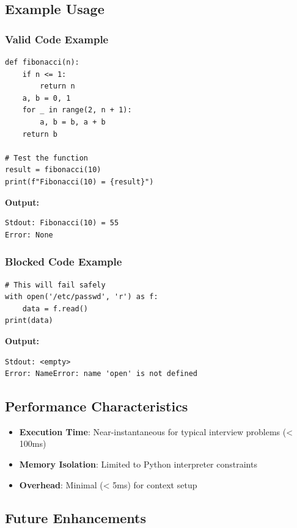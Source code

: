 \documentclass[12pt,a4paper]{article}
\begin{document}
\subsection{Example Usage}

\subsubsection{Valid Code Example}
\begin{lstlisting}[caption=Fibonacci Implementation]
def fibonacci(n):
    if n <= 1:
        return n
    a, b = 0, 1
    for _ in range(2, n + 1):
        a, b = b, a + b
    return b

# Test the function
result = fibonacci(10)
print(f"Fibonacci(10) = {result}")
\end{lstlisting}

\textbf{Output:}
\begin{verbatim}
Stdout: Fibonacci(10) = 55
Error: None
\end{verbatim}

\subsubsection{Blocked Code Example}
\begin{lstlisting}[caption=Attempted File Access (Blocked)]
# This will fail safely
with open('/etc/passwd', 'r') as f:
    data = f.read()
print(data)
\end{lstlisting}

\textbf{Output:}
\begin{verbatim}
Stdout: <empty>
Error: NameError: name 'open' is not defined
\end{verbatim}

\subsection{Performance Characteristics}

\begin{itemize}
    \item \textbf{Execution Time}: Near-instantaneous for typical interview problems (< 100ms)
    \item \textbf{Memory Isolation}: Limited to Python interpreter constraints
    \item \textbf{Overhead}: Minimal (< 5ms) for context setup
\end{itemize}

\subsection{Future Enhancements}
\end{document}
